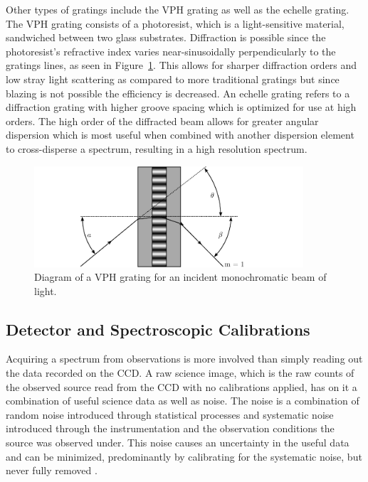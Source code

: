 Other types of gratings include the \gls{VPH} grating as well as the echelle grating. The \gls{VPH} grating consists of a photoresist, which is a light-sensitive material, sandwiched between two glass substrates. Diffraction is possible since the photoresist's refractive index varies near-sinusoidally perpendicularly to the gratings lines, as seen in Figure~\ref{fig:vph_grating}. This allows for sharper diffraction orders and low stray light scattering as compared to more traditional gratings but since blazing is not possible the efficiency is decreased. An echelle grating refers to a diffraction grating with higher groove spacing which is optimized for use at high orders. The high order of the diffracted beam allows for greater angular dispersion which is most useful when combined with another dispersion element to cross-disperse a spectrum, resulting in a high resolution spectrum.

\begin{figure}[t]
    \centering
    \includegraphics[width = 10cm]{figures/2_vph_grating.pdf}
    \caption{Diagram of a \gls{VPH} grating for an incident monochromatic beam of light.}
    \label{fig:vph_grating}
\end{figure}

\subsection{Detector and Spectroscopic Calibrations}\label{subsec:calibration}

Acquiring a spectrum from observations is more involved than simply reading out the data recorded on the \gls{CCD}. A raw science image, which is the raw counts of the observed source read from the \gls{CCD} with no calibrations applied, has on it a combination of useful science data as well as noise. The noise is a combination of random noise introduced through statistical processes and systematic noise introduced through the instrumentation and the observation conditions the source was observed under. This noise causes an uncertainty in the useful data and can be minimized, predominantly by calibrating for the systematic noise, but never fully removed \citep{CCDhandbook}.
\prgph

